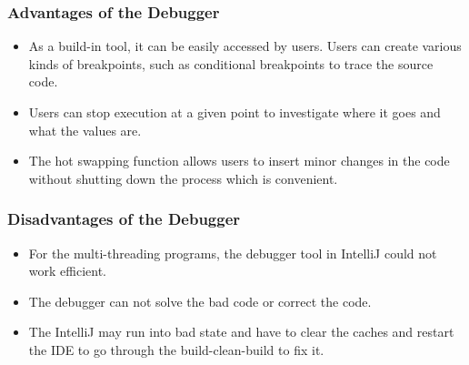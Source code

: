 \documentclass[11pt]{article}
\begin{document}
\subsubsection{Advantages of the Debugger}
\begin{center}
    \begin{itemize}
        \item As a build-in tool, it can be easily accessed by users. Users can create various kinds of breakpoints, such as conditional breakpoints to trace the source code.
        \item Users can stop execution at a given point to investigate where it goes and what the values are.
        \item The hot swapping function allows users to insert minor changes in the code without shutting down the process which is convenient.\cite{Anu:StackExchange}
    \end{itemize}
\end{center}

\subsubsection{Disadvantages of the Debugger}
\begin{center}
    \begin{itemize}
        \item For the multi-threading programs, the debugger tool in IntelliJ could not work efficient.
        \item The debugger can not solve the bad code or correct the code.
        \item The IntelliJ may run into bad state and have to clear the caches and restart the IDE to go through the build-clean-build to fix it.
    \end{itemize}
\end{center}
\end{document}
